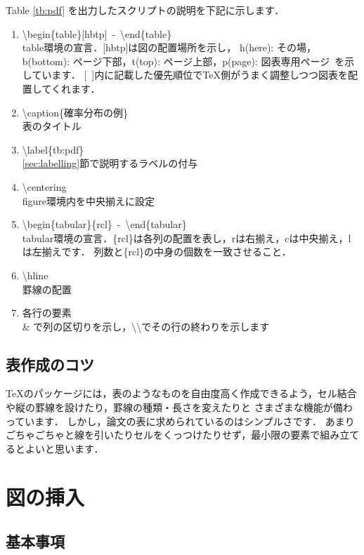 \documentclass[11pt,a4j,onecolumn]{jsreport} %
\begin{document}
\newpage

Table \ref{tb:pdf} を出力したスクリプトの説明を下記に示します．

\begin{enumerate}
  \item \textbackslash begin\{table\}[hbtp]~-~\textbackslash end\{table\}\\
    table環境の宣言．[hbtp]は図の配置場所を示し，
    h(here): その場，b(bottom): ページ下部，t(top): ページ上部，p(page): 図表専用ページ~を示しています．
    [~]内に記載した優先順位で\TeX 側がうまく調整しつつ図表を配置してくれます．
  \item \textbackslash caption\{確率分布の例\}\\
    表のタイトル
  \item \textbackslash label\{tb:pdf\}\\
    \ref{sec:labelling}節で説明するラベルの付与
  \item \textbackslash centering\\
    figure環境内を中央揃えに設定
  \item \textbackslash begin\{tabular\}\{rcl\}~-~\textbackslash end\{tabular\}\\
    tabular環境の宣言．\{rcl\}は各列の配置を表し，rは右揃え，cは中央揃え，lは左揃えです．
    列数と\{rcl\}の中身の個数を一致させること．
  \item \textbackslash hline\\
    罫線の配置
  \item 各行の要素\\
    \& で列の区切りを示し，\textbackslash\textbackslash でその行の終わりを示します
\end{enumerate}

\subsection{表作成のコツ}

\TeX のパッケージには，表のようなものを自由度高く作成できるよう，セル結合や縦の罫線を設けたり，罫線の種類・長さを変えたりと
さまざまな機能が備わっています．
しかし，論文の表に求められているのはシンプルさです．
あまりごちゃごちゃと線を引いたりセルをくっつけたりせず，最小限の要素で組み立てるとよいと思います．

\section{図の挿入}

\subsection{基本事項}
\end{document}
